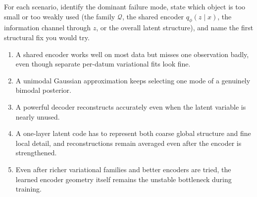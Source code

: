 \documentclass[11pt]{article}
\newif\ifshowsolutions
\newcommand{\SolutionBox}[2][10]{%
  \ifshowsolutions
    \begin{tcolorbox}[stat221panelgray,title={Solution}]
    #2
    \end{tcolorbox}
  \else
    \begin{tcolorbox}[stat221panelgray,unbreakable,title={Workspace}]
    \vspace{#1\baselineskip}
    \end{tcolorbox}
  \fi
}
\begin{document}
\begin{exercise}
\label{ex:vi-diagnostic-triage}
For each scenario, identify the dominant failure mode, state which object is too small or too weakly used (the family \(\mathcal{Q}\), the shared encoder \(q_\phi(z\mid x)\), the information channel through \(z\), or the overall latent structure), and name the first structural fix you would try.
\begin{enumerate}[leftmargin=*]
  \item A shared encoder works well on most data but misses one observation badly, even though separate per-datum variational fits look fine.
  \item A unimodal Gaussian approximation keeps selecting one mode of a genuinely bimodal posterior.
  \item A powerful decoder reconstructs accurately even when the latent variable is nearly unused.
  \item A one-layer latent code has to represent both coarse global structure and fine local detail, and reconstructions remain averaged even after the encoder is strengthened.
  \item Even after richer variational families and better encoders are tried, the learned encoder geometry itself remains the unstable bottleneck during training.
\end{enumerate}
\end{exercise}
\SolutionBox[12]{(1) This is an amortization gap: the family may be fine, but the shared encoder is the object that is too small to realize the right map everywhere. The first fix is to improve the encoder or add local refinement.
(2) This is family mismatch under forward KL: the variational family \(\mathcal{Q}\) is too small for the posterior geometry. The first fix is a richer family or a different latent factorization.
(3) This is posterior collapse: the information channel through \(z\) is too weakly used because the decoder can already explain the data. The first fix is to weaken decoder dominance or change the latent structure so information has to flow through \(z\).
(4) This is latent overlap: one bottleneck is being asked to carry incompatible scales of variation. The first structural fix is hierarchy, so different levels can carry different kinds of information.
(5) This is an encoder-geometry bottleneck: even after local family and encoder improvements, the learned posterior geometry itself remains unstable. The first structural fix is to prescribe the encoder geometry through a fixed bridge law.}
\end{document}

